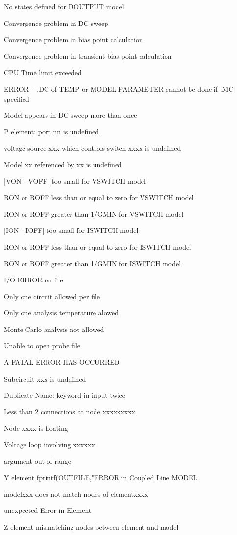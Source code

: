 No states defined for DOUTPUT model

Convergence problem in DC sweep

Convergence problem in bias point calculation

Convergence problem in transient bias point calculation

CPU Time limit exceeded

ERROR -- .DC of TEMP or MODEL PARAMETER cannot be done if .MC specified

Model appears in DC sweep more than once

P element:
port nn is undefined

voltage source xxx which controls switch xxxx is undefined

Model xx referenced by xx is undefined

|VON - VOFF| too small for VSWITCH model

RON or ROFF less than or equal to zero for VSWITCH model

RON or ROFF greater than 1/GMIN for VSWITCH model

|ION - IOFF| too small for ISWITCH model

RON or ROFF less than or equal to zero for ISWITCH model

RON or ROFF greater than 1/GMIN for ISWITCH model

I/O ERROR on file

Only one circuit allowed per file

Only one analysis temperature alowed

Monte Carlo analysis not allowed

Unable to open probe file

A FATAL ERROR HAS OCCURRED

Subcircuit xxx is undefined

Duplicate Name:
keyword in input twice

Less than 2 connections at node xxxxxxxxx

Node xxxx is floating

Voltage loop involving xxxxxx



argument out of range


Y element
fprintf(OUTFILE,"ERROR in Coupled Line MODEL

modelxxx does not match nodes of elementxxxx

unexpected Error in Element 



Z element
mismatching nodes between element and model


